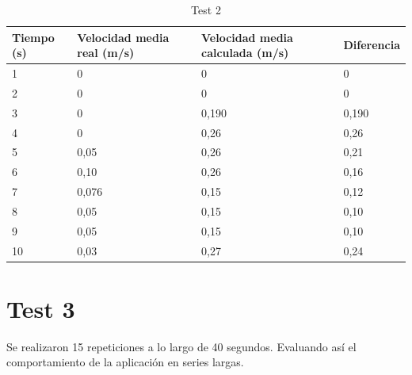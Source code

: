 \begin{table}[H]
\centering
\caption{Test 2}
\label{Test 2l}
\begin{tabular}{|l|l|l|l|}
\hline
Tiempo (s) & Velocidad media real (m/s) & Velocidad media calculada (m/s) & Diferencia \\ \hline
1          & 0                          & 0                               & 0          \\ \hline
2          & 0                          & 0                               & 0          \\ \hline
3          & 0                          & 0,190                           & 0,190      \\ \hline
4          & 0                          & 0,26                            & 0,26       \\ \hline
5          & 0,05                       & 0,26                            & 0,21       \\ \hline
6          & 0,10                       & 0,26                            & 0,16       \\ \hline
7          & 0,076                      & 0,15                            & 0,12       \\ \hline
8          & 0,05                       & 0,15                            & 0,10       \\ \hline
9          & 0,05                       & 0,15                            & 0,10       \\ \hline
10         & 0,03                       & 0,27                            & 0,24       \\ \hline
\end{tabular}
\end{table}

\section*{Test 3}

Se realizaron 15 repeticiones a lo largo de 40 segundos. Evaluando así el comportamiento de la aplicación en series largas.

